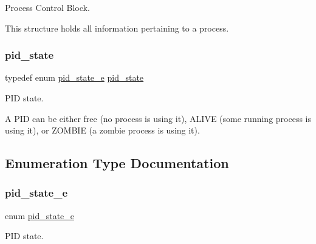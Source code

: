 Process Control Block. 

This structure holds all information pertaining to a process. \mbox{\label{group__proc_gade1eea4d20492c4c97263201145e5097}} 
\subsubsection{\texorpdfstring{pid\+\_\+state}{pid\_state}}
{\footnotesize\ttfamily typedef enum \hyperlink{group__proc_ga4f133ac5f9b2ca9c1446889baee1dc05}{pid\+\_\+state\+\_\+e}  \hyperlink{group__proc_gade1eea4d20492c4c97263201145e5097}{pid\+\_\+state}}



P\+ID state. 

A P\+ID can be either free (no process is using it), A\+L\+I\+VE (some running process is using it), or Z\+O\+M\+B\+IE (a zombie process is using it). 

\subsection{Enumeration Type Documentation}
\mbox{\label{group__proc_ga4f133ac5f9b2ca9c1446889baee1dc05}} 
\subsubsection{\texorpdfstring{pid\+\_\+state\+\_\+e}{pid\_state\_e}}
{\footnotesize\ttfamily enum \hyperlink{group__proc_ga4f133ac5f9b2ca9c1446889baee1dc05}{pid\+\_\+state\+\_\+e}}



P\+ID state. 


